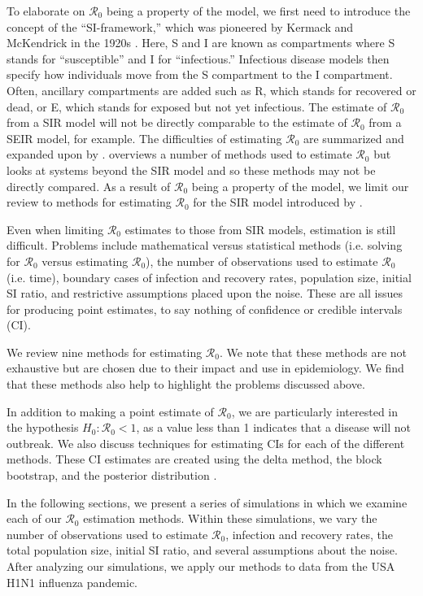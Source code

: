 \documentclass[12pt]{article}
\newcommand{\wxxsir}{nine } %
\newcommand{\rr}{\ensuremath{\mathcal{R}_0}}
\begin{document}
To elaborate on $\rr$ being a property of the model, we first need to introduce the concept of the ``SI-framework,'' which was pioneered by Kermack and McKendrick in the 1920s \citep{getz2006}.   Here, S and I are known as compartments where S stands for ``susceptible'' and I for ``infectious.'' Infectious disease models then specify how individuals move from the S compartment to the I compartment.  Often, ancillary compartments are added such as R, which stands for recovered or dead, or E, which stands for exposed but not yet infectious.  The estimate of $\rr$ from a SIR model will not be directly comparable to the estimate of $\rr$ from a SEIR model, for example.  The difficulties of estimating $\rr$ are summarized and expanded upon by \cite{li2011}.  \cite{driessche2017} overviews a number of methods used to estimate $\rr$ but looks at systems beyond the SIR model and so these methods may not be directly compared.   As a result of $\rr$ being a property of the model, we limit our review to methods for estimating $\rr$ for the SIR model introduced by \cite{Kermack700}.

Even when limiting $\rr$ estimates to those from SIR models, estimation is still difficult.  Problems include mathematical versus statistical methods (i.e. solving for $\rr$ versus estimating $\rr$), the number of observations used to estimate $\rr$ (i.e. time), boundary cases of infection and recovery rates, population size, initial SI ratio, and restrictive assumptions placed upon the noise.  These are all issues for producing point estimates, to say nothing of confidence or credible intervals (CI).

We review \wxxsir methods for estimating $\rr$.  We note that these methods are not exhaustive but are chosen due to their impact and use in epidemiology.  We find that these methods also help to highlight the problems discussed above.

In addition to making a point estimate of $\rr$, we are particularly interested in the hypothesis  $H_0: \rr < 1$, as a value less than 1 indicates that a disease will not outbreak.  We also discuss techniques for estimating CIs for each of the different methods.  These CI estimates are created using the delta method, the block bootstrap, and the posterior distribution \citep{cao1999,wasserman2004}.

In the following sections, we present a series of simulations in which we examine each of our $\rr$ estimation methods.  Within these simulations, we vary the number of observations used to estimate $\rr$, infection and recovery rates, the total population size, initial SI ratio, and several assumptions about the noise.  After analyzing our simulations, we apply our methods to data from the USA H1N1 influenza pandemic.
\end{document}
